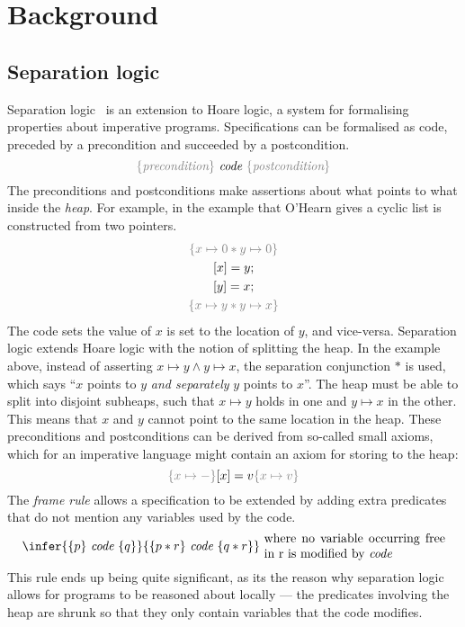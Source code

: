 \chapter{Background}\label{chapter:background}

\section{Separation logic}\label{sec:separationologic}
Separation logic~\cite{ohearn2019,reynolds2002} is an extension
to Hoare logic, a system for formalising properties about imperative
programs. Specifications can be formalised as code, preceded by a
precondition and succeeded by a postcondition.
\[
  {\color{gray} \{\textit{precondition}\}} \
  \textit{code} \
  {\color{gray} \{\textit{postcondition}\}}
\]
The preconditions and postconditions make assertions about what points
to what inside the \textit{heap}. For example, in the example that
O'Hearn gives a cyclic list is constructed from two pointers.
\begin{gather*}
  {\color{gray} \{ x \mapsto 0 * y \mapsto 0 \} }\\
  [x] = y; \\
  [y] = x; \\
  {\color{gray} \{ x \mapsto y * y \mapsto x \} }
\end{gather*}
The code sets the value of $x$ is set to the location of $y$, and
vice-versa. Separation logic extends Hoare logic with the notion of
splitting the heap. In the example above, instead of asserting
$x \mapsto y \wedge y \mapsto x$, the separation conjunction $*$ is used, which says
``$x$ points to $y$ \textit{and separately} $y$ points to $x$''. The
heap must be able to split into disjoint subheaps, such that
$x \mapsto y$ holds in one and $y \mapsto x$ in the other. This means that
$x$ and $y$ cannot point to the same location in the heap.
These preconditions and postconditions can be derived from so-called
small axioms, which for an imperative language might contain an axiom
for storing to the heap:
\[ {\color{gray} \{x \mapsto -\}} [x] = v {\color{gray} \{x \mapsto v\}} \]
The \textit{frame rule} allows a specification to be extended by
adding extra predicates that do not mention any variables used by the
code.
\[
  \infer{\{p\} \ \emph{code} \ \{q\}}
  {\{p * r\} \ \emph{code} \ \{ q * r \}} \
  \text{\parbox{2in}{where no variable
    occurring free in r is modified by \emph{code}}}
\]
This rule ends up being quite significant, as its the reason why
separation logic allows for programs to be reasoned about locally ---
the predicates involving the heap are shrunk so that they only contain
variables that the code modifies.

